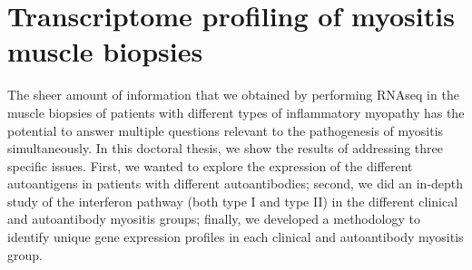 \begin{table}
\caption{Proposal of myositis classification based on myositis-specific autoantibodies}
\label{tab:criteria}
\end{table}

\section{Transcriptome profiling of myositis muscle biopsies}

The sheer amount of information that we obtained by performing RNAseq in the muscle biopsies of patients with different types of inflammatory myopathy has the potential to answer multiple questions relevant to the pathogenesis of myositis simultaneously. In this doctoral thesis, we show the results of addressing three specific issues. First, we wanted to explore the expression of the different autoantigens in patients with different autoantibodies; second, we did an in-depth study of the interferon pathway (both type I and type II) in the different clinical and autoantibody myositis groups; finally, we developed a methodology to identify unique gene expression profiles in each clinical and autoantibody myositis group.

